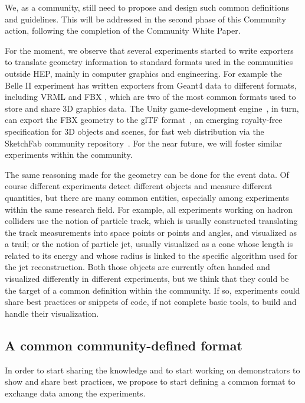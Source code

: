 \documentclass[12pt,a4paper]{article}
\begin{document}
We, as a community, still need to propose and design such common definitions and guidelines. This will
be addressed in the second phase of this Community action, following the completion of the Community White Paper.

For the moment, we observe that several experiments started to write exporters to translate geometry information to standard formats used in the communities outside HEP, mainly in computer graphics and engineering. For example the Belle II experiment has written exporters from Geant4 data to different formats, including VRML and FBX \cite{BelleIIGeoExporters}, which are two of the most common formats used to store and share 3D graphics data. The Unity game-development engine~\cite{Unity3D}, in turn, can export the FBX geometry to the glTF format~\cite{glTF}, an emerging royalty-free specification for 3D objects and scenes, for fast web distribution via the SketchFab community repository~\cite{SketchFabBelleII,SketchFab}. For the near future, we will foster similar experiments within the community.

The same reasoning made for the geometry can be done for the event data. Of course different experiments detect different objects and measure different quantities, but there are many common entities, especially among experiments within the same research field. For example, all experiments working on hadron colliders use the notion of particle track, which is usually constructed translating the track measurements into space points or points and angles, and visualized as a trail; or the notion of particle jet, usually visualized as a cone whose length is related to its energy and whose radius is linked to the specific algorithm used for the jet reconstruction. Both those objects are currently often handed and visualized differently in different experiments, but we think that they could be the target of a common definition within the community.
If so, experiments could share best practices or snippets of code, if not complete basic tools, to build and handle their visualization.



\hypertarget{common-format}{%
\subsection{A common community-defined format}\label{common-format}}

In order to start sharing the knowledge and to start working on demonstrators to show and share best practices, we propose to start defining a common format to exchange data among the experiments.
\end{document}
